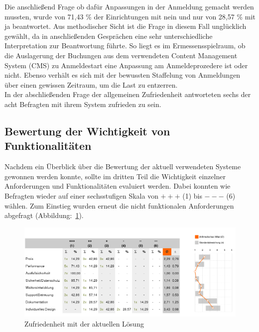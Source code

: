 Die anschließend Frage ob dafür Anpassungen in der Anmeldung gemacht werden mussten, wurde von 71,43 \% der Einrichtungen mit nein und nur von 28,57 \% mit ja beantwortet. Aus methodischer Sicht ist die Frage in diesem Fall unglücklich gewählt, da in anschließenden Gesprächen eine sehr unterschiedliche Interpretation zur Beantwortung führte. So liegt es im Ermessensspielraum, ob die Auslagerung der Buchungen aus dem verwendeten Content Management System (CMS) zu Anmeldestart eine Anpassung am Anmeldeprozedere ist oder nicht. Ebenso verhält es sich mit der bewussten Staffelung von Anmeldungen über einen gewissen Zeitraum, um die Last zu entzerren.
\\
In der abschließenden Frage der allgemeinen Zufriedenheit antworteten sechs der acht Befragten mit ihrem System zufrieden zu sein.

\subsection{Bewertung der Wichtigkeit von Funktionalitäten}
Nachdem ein Überblick über die Bewertung der aktuell verwendeten Systeme gewonnen werden konnte, sollte im dritten Teil die Wichtigkeit einzelner Anforderungen und Funktionalitäten evaluiert werden. Dabei konnten wie Befragten wieder auf einer sechsstufigen Skala von $+++$ (1) bis $---$ (6) wählen. Zum Einstieg wurden erneut die nicht funktionalen Anforderungen abgefragt (Abbildung:~\ref{fig:Umfrage_anforderungen}).

	\begin{figure}[h]
		\centering
		\includegraphics[width=1\linewidth]{images/umfrage_anforderungen}
		\caption{Zufriedenheit mit der aktuellen Lösung}
		\label{fig:Umfrage_anforderungen}
	\end{figure}
	
